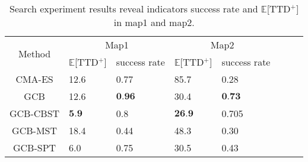 \begin{table}[htbp]
   \caption{Search experiment results reveal indicators success rate and $\mathbb{E}$[TTD$^+$] in map1 and map2. }
   \begin{center}
     \begin{tabular}{| c | l | l | l | l | l |  l | l |} \hline
      \multirow{2}{*}{Method} & \multicolumn{2}{c|}{Map1} & \multicolumn{2}{c|}{Map2}\\ \cline{2-5}
        & $\mathbb{E}$[TTD$^+$] & success rate & $\mathbb{E}$[TTD$^+$] & success rate\\ \hline\hline
       CMA-ES  & 12.6  & 0.77& 85.7  & 0.28\\ \hline
      GCB & 12.6  & $\textbf{0.96}$ & 30.4  & $\textbf{0.73}$ \\ \hline
      GCB-CBST & $\textbf{5.9}$  & 0.8& $\textbf{26.9}$  & 0.705\\ \hline
      GCB-MST & 18.4 & 0.44  & 48.3 & 0.30 \\ \hline
      GCB-SPT & 6.0 & 0.75 & 30.5 & 0.43\\ \hline
    \end{tabular}
   \end{center}
   \label{tab:ETTD_map}
\end{table}


